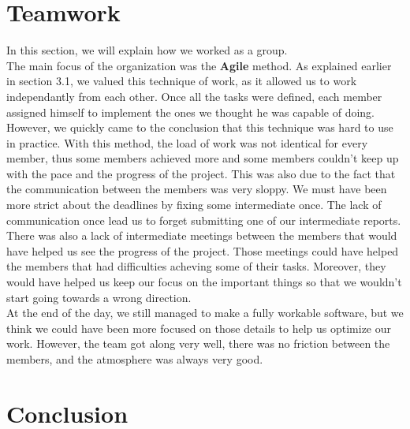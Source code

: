 \documentclass[a4paper, 12pt]{article}
\begin{document}
\section{Teamwork}

In this section, we will explain how we worked as a group.\\

The main focus of the organization was the \textbf{Agile} method. As explained earlier in section 3.1, we valued this technique of work, as it allowed us to work independantly from each other. Once all the tasks were defined, each member assigned himself to implement the ones we thought he was capable of doing.\\

However, we quickly came to the conclusion that this technique was hard to use in practice. With this method, the load of work was not identical for every member, thus some members achieved more and some members couldn't keep up with the pace and the progress of the project. This was also due to the fact that the communication between the members was very sloppy. We must have been more strict about the deadlines by fixing some intermediate once. The lack of communication once lead us to forget submitting one of our intermediate reports.\\

There was also a lack of intermediate meetings between the members that would have helped us see the progress of the project. Those meetings could have helped the members that had difficulties acheving some of their tasks. Moreover, they would have helped us keep our focus on the important things so that we wouldn't start going towards a wrong direction. \\

At the end of the day, we still managed to make a fully workable software, but we think we could have been more focused on those details to help us optimize our work. However, the team got along very well, there was no friction between the members, and the atmosphere was always very good.\\



\section{Conclusion}
\end{document}
